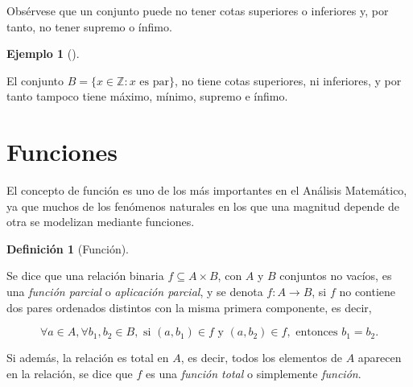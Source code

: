 \documentclass[
  a4paper,
]{scrreport}
\theoremstyle{plain}
\theoremstyle{plain}
\theoremstyle{definition}
\newtheorem{definition}{Definición}[chapter]
\theoremstyle{definition}
\newtheorem{example}{Ejemplo}[chapter]
\theoremstyle{plain}
\theoremstyle{definition}
\theoremstyle{remark}
\begin{document}
\begin{tcolorbox}[enhanced jigsaw, rightrule=.15mm, toptitle=1mm, colbacktitle=quarto-callout-warning-color!10!white, bottomrule=.15mm, opacityback=0, arc=.35mm, breakable, toprule=.15mm, left=2mm, coltitle=black, colback=white, opacitybacktitle=0.6, titlerule=0mm, colframe=quarto-callout-warning-color-frame, bottomtitle=1mm, title=\textcolor{quarto-callout-warning-color}{\faExclamationTriangle}\hspace{0.5em}{Advertencia}, leftrule=.75mm]

Obsérvese que un conjunto puede no tener cotas superiores o inferiores
y, por tanto, no tener supremo o ínfimo.

\end{tcolorbox}

\begin{example}[]\protect\hypertarget{exm-no-supremo-infimio}{}\label{exm-no-supremo-infimio}

El conjunto \(B=\{x\in\mathbb{Z}: x \mbox{ es par}\}\), no tiene cotas
superiores, ni inferiores, y por tanto tampoco tiene máximo, mínimo,
supremo e ínfimo.

\end{example}

\hypertarget{funciones}{%
\section{Funciones}\label{funciones}}

El concepto de función es uno de los más importantes en el Análisis
Matemático, ya que muchos de los fenómenos naturales en los que una
magnitud depende de otra se modelizan mediante funciones.

\begin{definition}[Función]\protect\hypertarget{def-funcion}{}\label{def-funcion}

Se dice que una relación binaria \(f \subseteq A \times B\), con \(A\) y
\(B\) conjuntos no vacíos, es una \emph{función parcial} o
\emph{aplicación parcial}, y se denota \(f:A\rightarrow B\), si \(f\) no
contiene dos pares ordenados distintos con la misma primera componente,
es decir,

\[
\forall a \in A, \forall b_1, b_2 \in B, \mbox{ si } (a,b_1) \in f \mbox{ y } (a,b_2) \in f, \mbox{ entonces } b_1 = b_2.
\]

Si además, la relación es total en \(A\), es decir, todos los elementos
de \(A\) aparecen en la relación, se dice que \(f\) es una \emph{función
total} o simplemente \emph{función}.

\end{definition}
\end{document}
